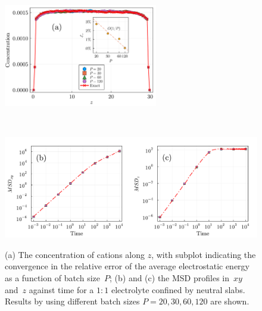 \begin{figure}[ht]
	\centering
	\begin{minipage}[c]{\textwidth}
		\centering
		\includegraphics[width=0.6\textwidth]{figs/hist_norm.pdf}
		\label{fig:compare}
	\end{minipage} \\
	\begin{minipage}[c]{\textwidth}
		\centering
		\includegraphics[width=\textwidth]{figs/msd_norm.pdf} 
		\label{fig:msd_norm}
	\end{minipage} 
	\caption{
		(a) The concentration of cations along $z$, with subplot indicating the convergence in the relative error of the average electrostatic energy as a function of batch size~$P$; (b) and (c) the MSD profiles in~$xy$ and~$z$ against time for a $1:1$ electrolyte confined by neutral slabs. 
		Results by using different batch sizes $P=20, 30, 60, 120$ are shown. 
	}
	\label{fig:norm}
\end{figure}

